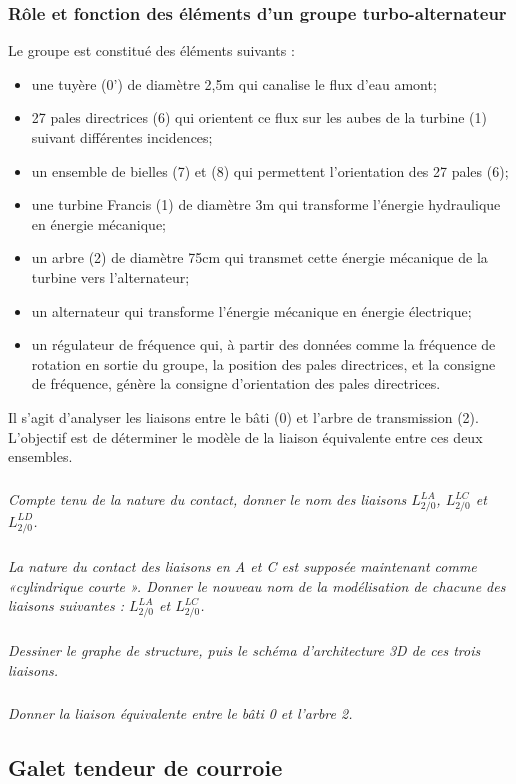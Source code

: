 \documentclass[10pt]{article}
\begin{document}
\subsubsection*{Rôle et fonction des éléments d'un groupe turbo-alternateur}
Le groupe est constitué des éléments suivants :
\begin{itemize}
\item une tuyère (0') de diamètre 2,5m qui canalise le flux d'eau amont;
\item 27 pales directrices (6) qui orientent ce flux sur les aubes de la turbine (1) suivant différentes incidences;
\item un ensemble de bielles (7) et (8) qui permettent l’orientation des 27 pales (6);
\item une turbine Francis (1) de diamètre 3m qui transforme l'énergie hydraulique en énergie mécanique;
\item un arbre (2) de diamètre 75cm qui transmet cette énergie mécanique de la turbine vers l'alternateur;
\item un alternateur qui transforme l'énergie mécanique en énergie électrique;
\item un régulateur de fréquence qui, à partir des données comme la fréquence de rotation en sortie du
groupe, la position des pales directrices, et la consigne de fréquence, génère la consigne d'orientation
des pales directrices.
\end{itemize}

Il s'agit d'analyser les liaisons entre le bâti (0) et l'arbre de transmission (2).
L’objectif est de déterminer le modèle de la liaison équivalente entre ces deux ensembles.

\subparagraph{}
\textit{Compte tenu de la nature du contact, donner le nom des liaisons $L_{2/0}^{LA}$, $L_{2/0}^{LC}$ et $L_{2/0}^{LD}$.}

\subparagraph{}
\textit{La nature du contact des liaisons en A et C est supposée maintenant comme «cylindrique courte ». Donner le nouveau nom de la modélisation de chacune des liaisons suivantes : $L_{2/0}^{LA}$ et $L_{2/0}^{LC}$.}

\subparagraph{}
\textit{Dessiner le graphe de structure, puis le schéma d’architecture 3D de ces trois liaisons.}

\subparagraph{}
\textit{Donner la liaison équivalente entre le bâti 0 et l’arbre 2.}


\subsection*{Galet tendeur de courroie}
\setcounter{subparagraph}{0}
\end{document}
